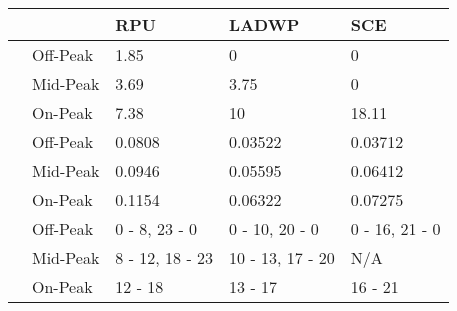 \begin{tabularx}{\linewidth}{X|X|l | l | l }
\toprule
          & &  RPU &   LADWP   &  SCE  \\
\midrule
	\parbox[t]{5mm}{} &
        Off-Peak  &  1.85   &   0  &  0     \\
        & Mid-Peak   &  3.69  &   3.75  &   0     \\
        & On-Peak    &  7.38 &   10 &  18.11    \\
     \parbox[t]{5mm}{} &
        Off-Peak   &  0.0808 &   0.03522 &  0.03712    \\
        & Mid-Peak   &  0.0946 & 0.05595 &  0.06412    \\
        & On-Peak   &  0.1154  &  0.06322 &   0.07275     \\
       \parbox[t]{5mm}{} &
        Off-Peak  &  0 - 8, 23 - 0  & 0 - 10, 20 - 0  &   0 - 16, 21 - 0   \\
        & Mid-Peak  & 8 - 12, 18 - 23  &  10 - 13, 17 - 20  &   N/A     \\
        & On-Peak  & 12 - 18 & 13 - 17  &  16 - 21  \\  
\bottomrule
\end{tabularx}
